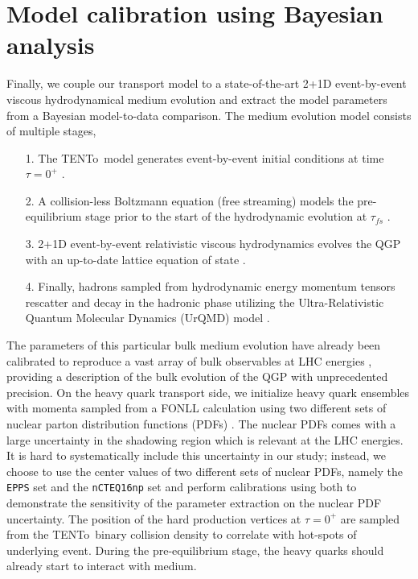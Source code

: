 \documentclass[aps, prc, reprint, amsmath, groupedaddress, nofootinbib]{revtex4-1}
\newcommand{\trento}{T\raisebox{-0.5ex}{R}ENTo}
\begin{document}
\section{Model calibration using Bayesian analysis}\label{section:calibration}
Finally, we couple our transport model to a state-of-the-art 2+1D event-by-event viscous hydrodynamical medium evolution and extract the model parameters from a Bayesian model-to-data comparison.
The medium evolution model consists of multiple stages,
\begin{itemize}
\item[1.] The \trento\ model generates event-by-event initial conditions at time $\tau = 0^+$ \cite{Moreland:2014oya}. 
\item[2.] A collision-less Boltzmann equation (free streaming) models the pre-equilibrium stage prior to the start of the hydrodynamic evolution at $\tau_{fs}$ \cite{Liu:2015nwa}.
\item[3.] 2+1D event-by-event relativistic viscous hydrodynamics evolves the QGP with an up-to-date lattice equation of state \cite{Shen:2014vra, Bazavov:2014pvz}.
\item[4.] Finally, hadrons sampled from hydrodynamic energy momentum tensors rescatter and decay in the hadronic phase utilizing the Ultra-Relativistic Quantum Molecular Dynamics (UrQMD) model \cite{Bass:1998ca, Bleicher:1999xi}.
\end{itemize}
The parameters of this particular bulk medium evolution have already been calibrated to reproduce a vast array of bulk observables at LHC energies \cite{Bernhard:2018hnz}, providing a description of the bulk evolution of the QGP with unprecedented precision.
On the heavy quark transport side, we initialize heavy quark ensembles with momenta sampled from a FONLL calculation using two different sets of nuclear parton distribution functions (PDFs) \cite{Cacciari:1998it,Kovarik:2015cma,Eskola:2016oht}. 
The nuclear PDFs comes with a large uncertainty in the shadowing region which is relevant at the LHC energies.
It is hard to systematically include this uncertainty in our study; instead, we choose to use the center values of two different sets of nuclear PDFs, namely the {\tt EPPS} set and the {\tt nCTEQ16np} set and perform calibrations using both to demonstrate the sensitivity of the parameter extraction on the nuclear PDF uncertainty.
The position of the hard production vertices at $\tau = 0^+$ are sampled from the \trento\ binary collision density to correlate with hot-spots of  underlying event. 
During the pre-equilibrium stage, the heavy quarks should already start to interact with medium.
\end{document}
